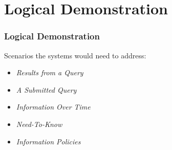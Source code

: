 \section{Logical Demonstration}
\begin{frame}
\frametitle{Logical Demonstration}
Scenarios the systems would need to address:
\begin{itemize}
\item<2-> \textit{Results from a Query}
\item<3-> \textit{A Submitted Query}
\item<4-> \textit{Information Over Time}
\item<5-> \textit{Need-To-Know}
\item<6-> \textit{Information Policies}
\end{itemize}
\end{frame}
